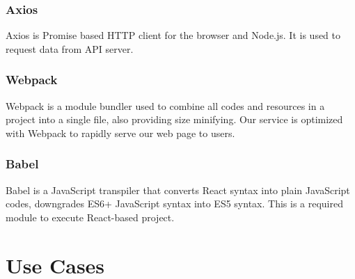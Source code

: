 \documentclass[conference,compsoc]{IEEEtran}
\begin{document}
\subsubsection{Axios}
Axios is Promise based HTTP client for the browser and Node.js. It is used to request data from API server.

\subsubsection{Webpack}
Webpack is a module bundler used to combine all codes and resources in a project into a single file, also providing size minifying. Our service is optimized with Webpack to rapidly serve our web page to users.

\subsubsection{Babel}
Babel is a JavaScript transpiler that converts React syntax into plain JavaScript codes, downgrades ES6+ JavaScript syntax into ES5 syntax. This is a required module to execute React-based project.

\section{Use Cases}


%
%

\end{document}
